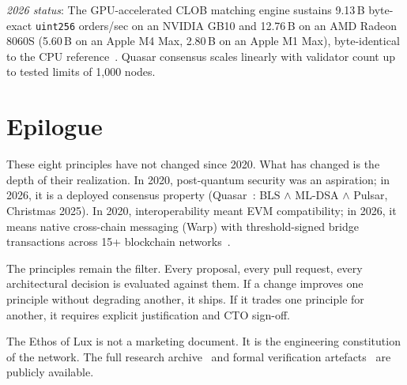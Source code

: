 \documentclass[11pt,a4paper]{article}
\begin{document}
\medskip\noindent\textit{2026 status}: The GPU-accelerated CLOB matching
engine sustains 9.13\,B byte-exact \texttt{uint256} orders/sec on an NVIDIA
GB10 and 12.76\,B on an AMD Radeon 8060S (5.60\,B on an Apple M4 Max, 2.80\,B
on an Apple M1 Max), byte-identical to the CPU reference~\cite{lp306}. Quasar
consensus scales linearly with validator count up to tested limits of 1,000
nodes.

\section{Epilogue}

These eight principles have not changed since 2020. What has changed
is the depth of their realization. In 2020, post-quantum security was
an aspiration; in 2026, it is a deployed consensus property
(Quasar~\cite{lp105}: BLS $\wedge$ ML-DSA $\wedge$ Pulsar, Christmas 2025).
In 2020, interoperability meant EVM compatibility; in 2026, it means
native cross-chain messaging (Warp) with threshold-signed bridge
transactions across 15+ blockchain networks~\cite{lux-mpc}.

The principles remain the filter. Every proposal, every pull request,
every architectural decision is evaluated against them. If a change
improves one principle without degrading another, it ships. If it
trades one principle for another, it requires explicit justification
and CTO sign-off.

The Ethos of Lux is not a marketing document. It is the engineering
constitution of the network. The full research archive~\cite{lux-papers} and formal
verification artefacts~\cite{lux-proofs} are publicly available.

\end{document}
